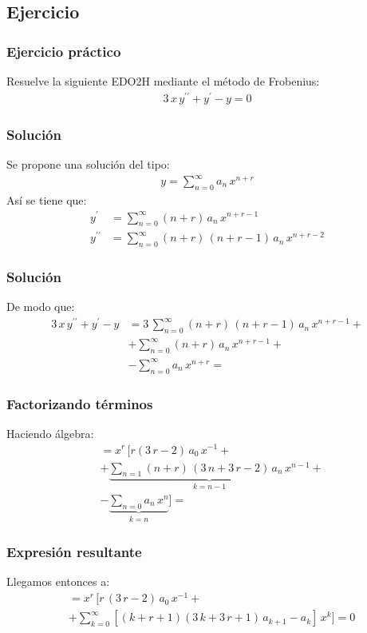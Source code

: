 \subsection{Ejercicio}
\begin{frame}
\frametitle{Ejercicio práctico}
Resuelve la siguiente EDO2H mediante el método de Frobenius:
\begin{align}
3 \, x \, y^{\prime \prime} + y^{\prime} - y = 0
\label{eq:ecuacion_04}    
\end{align}
\end{frame}
\begin{frame}
\frametitle{Solución}
Se propone una solución del tipo:
\begin{align*}
y = \sum_{n=0}^{\infty} a_{n} \, x^{n+r}
\end{align*}
\pause
Así se tiene que:
\begin{align*}
y^{\prime} &= \sum_{n=0}^{\infty} (n + r) \, a_{n} \, x^{n+r-1} \\[0.5em]
y^{\prime \prime} &= \sum_{n=0}^{\infty} (n + r) \, (n + r - 1) \, a_{n} \, x^{n+r-2}
\end{align*}
\end{frame}
\begin{frame}
\frametitle{Solución}
De modo que:
\begin{align*}
3 \, x \, y^{\prime \prime} + y^{\prime} - y &= 3 \, \sum_{n=0}^{\infty} (n + r) \, (n + r - 1) \, a_{n} \, x^{n+r-1} + \\[0.5em]
&+ \sum_{n=0}^{\infty} (n + r) \, a_{n} \, x^{n+r-1} + \\[0.5em]
&- \sum_{n=0}^{\infty} a_{n} \, x^{n+r} =
\end{align*}
\end{frame}
\begin{frame}
\frametitle{Factorizando términos}
Haciendo álgebra:
\fontsize{12}{12}\selectfont
\begin{align*}
&= x^{r} \, \bigg[ r (3 \, r - 2) \, a_{0} \, x^{-1} +  \\[0.5em]
&+ \underbrace{\sum_{n=1} (n + r)\,(3 \, n + 3 \, r - 2) \, a_{n} \, x^{n-1}}_{k=n-1} + \\[0.5em]
&- \underbrace{\sum_{n=0} a_{n} \, x^{n}}_{k=n} \bigg] =
\end{align*}
\end{frame}
\begin{frame}
\frametitle{Expresión resultante}
Llegamos entonces a:
\begin{align*}
&= x^{r} \, \bigg[ r \, (3 \, r - 2) \, a_{0} \, x^{-1} + \\[0.5em]
&+ \sum_{k=0}^{\infty} \left[ (k + r + 1)(3 \, k + 3 \, r + 1) \, a_{k+1} - a_{k} \right] \, x^{k} \bigg] = 0
\end{align*}
\end{frame}
